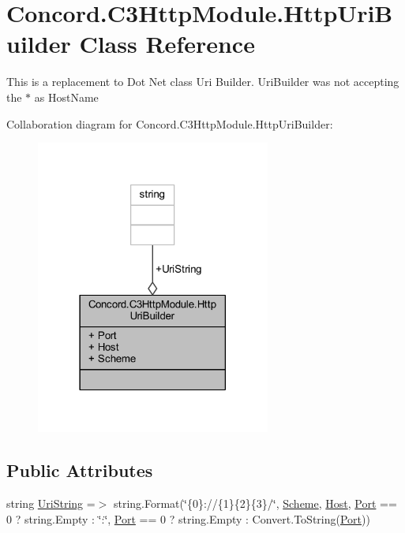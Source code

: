 \hypertarget{class_concord_1_1_c3_http_module_1_1_http_uri_builder}{}\section{Concord.\+C3\+Http\+Module.\+Http\+Uri\+Builder Class Reference}
\label{class_concord_1_1_c3_http_module_1_1_http_uri_builder}


This is a replacement to Dot Net class Uri Builder. Uri\+Builder was not accepting the $\ast$ as Host\+Name  




Collaboration diagram for Concord.\+C3\+Http\+Module.\+Http\+Uri\+Builder\+:\nopagebreak
\begin{figure}[H]
\begin{center}
\leavevmode
\includegraphics[width=218pt]{class_concord_1_1_c3_http_module_1_1_http_uri_builder__coll__graph}
\end{center}
\end{figure}
\subsection*{Public Attributes}
\begin{DoxyCompactItemize}
\item 
string \mbox{\hyperlink{class_concord_1_1_c3_http_module_1_1_http_uri_builder_a6415279869c6a83068a99084b334c32c}{Uri\+String}} =$>$ string.\+Format(\char`\"{}\{0\}\+://\{1\}\{2\}\{3\}/\char`\"{}, \mbox{\hyperlink{class_concord_1_1_c3_http_module_1_1_http_uri_builder_aec68ef1c873d7894850552ee9067119a}{Scheme}}, \mbox{\hyperlink{class_concord_1_1_c3_http_module_1_1_http_uri_builder_aea098c21d58cb7c0f34dba606cee80fd}{Host}}, \mbox{\hyperlink{class_concord_1_1_c3_http_module_1_1_http_uri_builder_adc628b6895d402e3f805cabafce8cb11}{Port}} == 0 ? string.\+Empty \+: \char`\"{}\+:\char`\"{}, \mbox{\hyperlink{class_concord_1_1_c3_http_module_1_1_http_uri_builder_adc628b6895d402e3f805cabafce8cb11}{Port}} == 0 ? string.\+Empty \+: Convert.\+To\+String(\mbox{\hyperlink{class_concord_1_1_c3_http_module_1_1_http_uri_builder_adc628b6895d402e3f805cabafce8cb11}{Port}}))
\end{DoxyCompactItemize}
